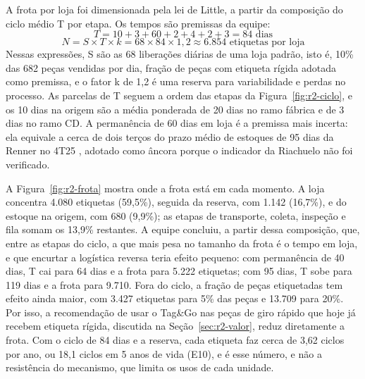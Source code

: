 A frota por loja foi dimensionada pela lei de Little, a partir da composição do ciclo médio T por etapa. Os tempos são premissas da equipe:
\begin{equation}
    T = 10 + 3 + 60 + 2 + 4 + 2 + 3 = 84 \text{ dias}
\end{equation}
\begin{equation}
    N = S \times T \times k = 68 \times 84 \times 1{,}2 \approx 6.854 \text{ etiquetas por loja}
\end{equation}
Nessas expressões, S são as 68 liberações diárias de uma loja padrão, isto é, 10\% das 682 peças vendidas por dia, fração de peças com etiqueta rígida adotada como premissa, e o fator k de 1,2 é uma reserva para variabilidade e perdas no processo. As parcelas de T seguem a ordem das etapas da Figura~\ref{fig:r2-ciclo}, e os 10 dias na origem são a média ponderada de 20 dias no ramo fábrica e de 3 dias no ramo CD. A permanência de 60 dias em loja é a premissa mais incerta: ela equivale a cerca de dois terços do prazo médio de estoques de 95 dias da Renner no 4T25 \cite{renner2026resultados}, adotado como âncora porque o indicador da Riachuelo não foi verificado.

A Figura~\ref{fig:r2-frota} mostra onde a frota está em cada momento. A loja concentra 4.080 etiquetas (59,5\%), seguida da reserva, com 1.142 (16,7\%), e do estoque na origem, com 680 (9,9\%); as etapas de transporte, coleta, inspeção e fila somam os 13,9\% restantes. A equipe concluiu, a partir dessa composição, que, entre as etapas do ciclo, a que mais pesa no tamanho da frota é o tempo em loja, e que encurtar a logística reversa teria efeito pequeno: com permanência de 40 dias, T cai para 64 dias e a frota para 5.222 etiquetas; com 95 dias, T sobe para 119 dias e a frota para 9.710. Fora do ciclo, a fração de peças etiquetadas tem efeito ainda maior, com 3.427 etiquetas para 5\% das peças e 13.709 para 20\%. Por isso, a recomendação de usar o Tag\&Go nas peças de giro rápido que hoje já recebem etiqueta rígida, discutida na Seção~\ref{sec:r2-valor}, reduz diretamente a frota. Com o ciclo de 84 dias e a reserva, cada etiqueta faz cerca de 3,62 ciclos por ano, ou 18,1 ciclos em 5 anos de vida (E10), e é esse número, e não a resistência do mecanismo, que limita os usos de cada unidade.

